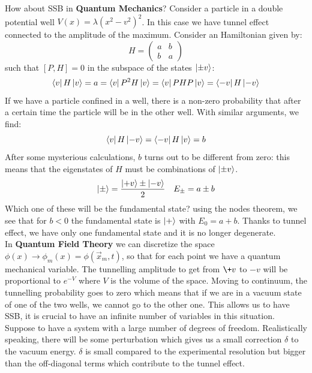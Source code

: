 \documentclass[../main.tex]{subfiles}
\begin{document}
How about SSB in \textbf{Quantum Mechanics}? Consider a particle in a double potential well $V(x)=\lambda(x^2-v^2)^2$. In this case we have tunnel effect connected to the amplitude of the maximum. Consider an Hamiltonian given by:
\[
H=\left(\begin{array}{cc}
    a & b \\
    b & a
\end{array}\right)
\]
such that $[P,H]=0$ in the subspace of the states $\ket{\pm v}$:
\[
\bra{v}H\ket{v}=a=\bra{v}P^2H\ket{v}=\bra{v}PHP\ket{v}=\bra{-v}H\ket{-v}
\]
If we have a particle confined in a well, there is a non-zero probability that after a certain time the particle will be in the other well. With similar arguments, we find:
\[
\bra{v}H\ket{-v}=\bra{-v}H\ket{v}=b
\]
After some mysterious calculations, $b$ turns out to be different from zero: this means that the eigenstates of $H$ must be combinations of $\ket{\pm v}$.
\[
\ket{\pm}=\frac{\ket{+v}\pm\ket{-v}}{2} \quad E_\pm=a\pm b
\]
Which one of these will be the fundamental state? using the nodes theorem, we see that for $b<0$ the fundamental state is $\ket{+}$ with $E_0=a+b$. Thanks to tunnel effect, we have only one fundamental state and it is no longer degenerate.\\
In \textbf{Quantum Field Theory} we can discretize the space\\
$\phi(x)\to\phi_m(x)=\phi(\Vec{x}_m,t)$, so that for each point we have a quantum mechanical variable. The tunnelling amplitude to get from $\+v$ to $-v$ will be proportional to $e^{-V}$ where $V$ is the volume of the space. Moving to continuum, the tunnelling probability goes to zero which means that if we are in a vacuum state of one of the two wells, we cannot go to the other one. This allows us to have SSB, it is crucial to have an infinite number of variables in this situation.\\
Suppose to have a system with a large number of degrees of freedom. Realistically speaking, there will be some perturbation which gives us a small correction $\delta$ to the vacuum energy. $\delta$ is small compared to the experimental resolution but bigger than the off-diagonal terms which contribute to the tunnel effect. 
\end{document}

